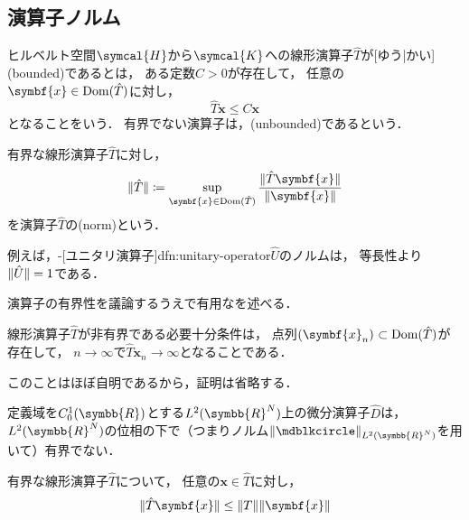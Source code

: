 \documentclass[../sotsu.tex]{subfiles}
\begin{document}
\subsection{演算子ノルム}

\begin{definition}[有界な演算子]
    \label{dfn:bounded-operator}
    ヒルベルト空間$\symcal{H}$から$\symcal{K}$への線形演算子$\hat{T}$が[ゆう|かい](bounded)であるとは，
    ある定数$C > 0$が存在して，
    任意の$\symbf{x} \in \domain(\hat{T})$に対し，
    \begin{equation*}
        \hat{T} \symbf{x} \leq C \symbf{x}
    \end{equation*}
    となることをいう．
    有界でない演算子は，(unbounded)であるという．
\end{definition}

\begin{definition}[演算子ノルム]
    \label{dfn:operator-norm}
    有界な線形演算子$\hat{T}$に対し，
    \begin{equation}
        \opnorm{\hat{T}} \coloneq \sup_{\symbf{x} \in \domain(\hat{T})} \frac{\norm{\hat{T} \symbf{x}}}{\norm{\symbf{x}}}
    \end{equation}
    を演算子$\hat{T}$の(norm)という．
\end{definition}

例えば，-[ユニタリ演算子]{dfn:unitary-operator}$\hat{U}$のノルムは，
等長性より$\lVert\hat{U}\rVert = 1$である．

演算子の有界性を議論するうえで有用なを述べる．

\begin{proposition}
    \label{thm:unbounded-operator-iff}
    線形演算子$\hat{T}$が非有界である必要十分条件は，
    点列$\sequ{\symbf{x}_n} \subset \domain(\hat{T})$が存在して，
    $n \to \infty$で$\hat{T} \symbf{x}_n \to \infty$となることである．
\end{proposition}

このことはほぼ自明であるから，証明は省略する．


\begin{proposition}
    定義域を$C_0^1 (\symbb{R})$とする$L^2 (\symbb{R}^N)$上の微分演算子$\hat{D}$は，
    $L^2 (\symbb{R}^N)$の位相の下で（つまりノルム$\norm{\bigdot}_{L^2 (\symbb{R}^N)}$を用いて）有界でない．
\end{proposition}


\begin{lemma}
    \label{thm:norm-and-operator-norm}
    有界な線形演算子$\hat{T}$について，
    任意の$\symbf{x} \in \hat{T}$に対し，
    \begin{equation*}
        \norm{\hat{T} \symbf{x}} \leq \opnorm{T} \norm{\symbf{x}}
    \end{equation*}
\end{lemma}
\end{document}
